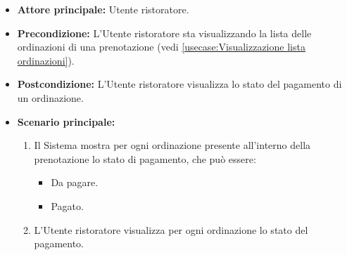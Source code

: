 \label{usecase:Visualizzazione stato di pagamento}
\begin{itemize}
	
    \item \textbf{Attore principale:} Utente ristoratore.

	\item \textbf{Precondizione:} L'Utente ristoratore sta visualizzando la lista delle ordinazioni di una prenotazione (vedi \autoref{usecase:Visualizzazione lista ordinazioni}).

	\item \textbf{Postcondizione:} L'Utente ristoratore visualizza lo stato del pagamento di un ordinazione.

	\item \textbf{Scenario principale:}
	\begin{enumerate}
		\item Il Sistema mostra per ogni ordinazione presente all'interno della prenotazione lo stato di pagamento, che può essere:
        \begin{itemize}
            \item Da pagare.
            \item Pagato.
        \end{itemize}
        \item L'Utente ristoratore visualizza per ogni ordinazione lo stato del pagamento.
	\end{enumerate}

\end{itemize}